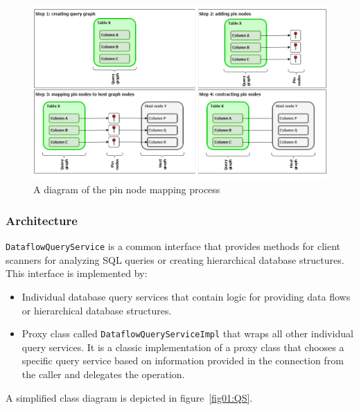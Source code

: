 \begin{figure}[ht]\centering
\includegraphics[width=1.0\textwidth]{img/pin_nodes.png}
\caption{A diagram of the pin node mapping process}
\label{fig:pinNodes}
\end{figure}  

\subsubsection{Architecture}

\texttt{DataflowQueryService} is a common interface that provides methods for client scanners for analyzing SQL queries or creating hierarchical database structures. This interface is implemented by:
\begin{itemize}
    \item Individual database query services that contain logic for providing data flows or hierarchical database structures.
    \item Proxy class called \texttt{DataflowQueryServiceImpl} that wraps all other individual query services. It is a classic implementation of a proxy class that chooses a specific query service based on information provided in the connection from the caller and delegates the operation.    
\end{itemize}

A simplified class diagram is depicted in figure~\ref{fig01:QS}.

